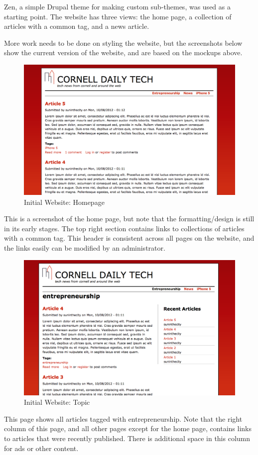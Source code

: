 \documentclass[12pt]{article} %
\begin{document}
Zen, a simple Drupal theme for making custom sub-themes, was used as a starting point. The website has three views: the home page, a collection of articles with a common tag, and a news article.

More work needs to be done on styling the website, but the screenshots below show the current version of the website, and are based on the mockups above.

\begin{figure}[htbp]
\begin{center}
\includegraphics[width=5in]{images/web-main}
\caption{Initial Website: Homepage}
\end{center}
\end{figure}
This is a screenshot of the home page, but note that the formatting/design is still in its early stages. The top right section contains links to collections of articles with a common tag. This header is consistent across all pages on the website, and the links easily can be modified by an administrator.

\begin{figure}[htbp]
\begin{center}
\includegraphics[width=5in]{images/web-topic}
\caption{Initial Website: Topic}
\end{center}
\end{figure}
This page shows all articles tagged with entrepreneurship. Note that the right column of this page, and all other pages except for the home page, contains links to articles that were recently published. There is additional space in this column for ads or other content.
\end{document}

